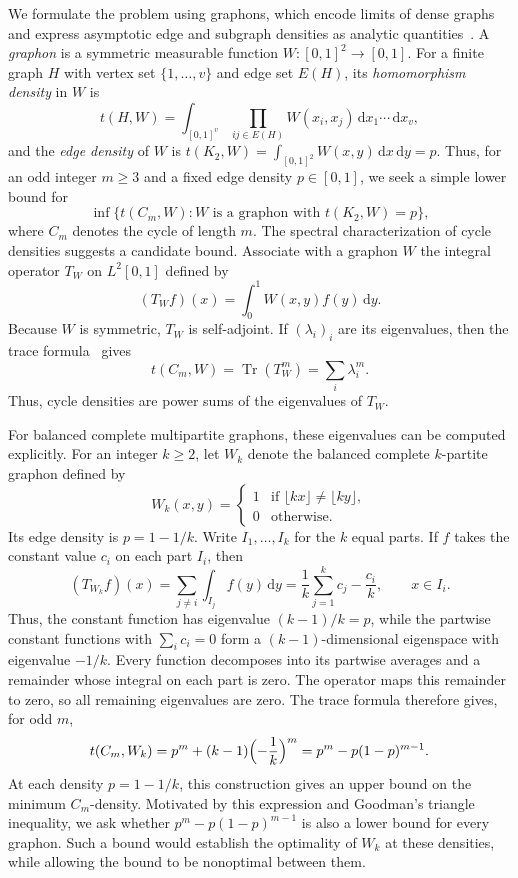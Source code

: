 \documentclass[11pt]{article}
\numberwithin{equation}{section}
\newcommand{\Tr}{\operatorname{Tr}}
\newcommand{\dd}{\,\mathrm d}
\newcommand{\dens}[2]{t(#1,#2)}
\newcommand{\tC}[2]{t(C_{#1},#2)}
\newcommand{\edens}[1]{t(K_{2},#1)}
\newcommand{\goodman}[2]{#1^{#2}-#1(1-#1)^{#2-1}}
\newcommand{\goal}{\goodman{p}{m}}
\newcommand{\Tker}[1]{T_{#1}}
\newcommand{\intsq}{\int_{[0,1]^2}}
\newcommand{\intcube}[1]{\int_{[0,1]^{#1}}}
\newcommand{\ddxy}{\dd x\dd y}
\begin{document}
We formulate the problem using graphons, which encode limits of dense graphs and express asymptotic edge and subgraph densities as analytic quantities~\cite{lovasz2012large,lovasz2006limits}.
A \emph{graphon} is a symmetric measurable function $W\colon[0,1]^2\to[0,1]$.
For a finite graph $H$ with vertex set $\{1,\ldots,v\}$ and edge set $E(H)$, its \emph{homomorphism density} in $W$ is
\[
  \dens HW=\intcube{v}\prod_{ij\in E(H)}W(x_i,x_j)\dd x_1\cdots\dd x_v,
\]
and the \emph{edge density} of $W$ is $\edens W=\intsq W(x,y)\ddxy=p$.
Thus, for an odd integer $m\ge3$ and a fixed edge density $p\in[0,1]$, we seek a simple lower bound for
\[
  \inf\bigl\{\tC mW: W\text{ is a graphon with }\edens W=p\bigr\},
\]
where $C_m$ denotes the cycle of length $m$.
The spectral characterization of cycle densities suggests a candidate bound.
Associate with a graphon $W$ the integral operator $\Tker W$ on $L^2[0,1]$ defined by
\[
  (\Tker{W}f)(x)=\int_0^1 W(x,y)f(y)\dd y.
\]
Because $W$ is symmetric, $\Tker W$ is self-adjoint.
If $(\lambda_i)_i$ are its eigenvalues, then the trace formula~\cite{lovasz2012large} gives
\[
  \tC mW=\Tr(\Tker W^m)=\sum_i\lambda_i^m.
\]
Thus, cycle densities are power sums of the eigenvalues of $\Tker W$.

For balanced complete multipartite graphons, these eigenvalues can be computed explicitly.
For an integer $k\ge2$, let $W_k$ denote the balanced complete $k$-partite graphon defined by
\[
  W_k(x,y)=
  \begin{cases}
    1&\text{if }\lfloor kx\rfloor\ne\lfloor ky\rfloor,\\
    0&\text{otherwise}.
\end{cases}
\]
Its edge density is $p=1-1/k$.
Write $I_1,\ldots,I_k$ for the $k$ equal parts.
If $f$ takes the constant value $c_i$ on each part $I_i$, then
\[
  (\Tker{W_k}f)(x)=\sum_{j\ne i}\int_{I_j}f(y)\dd y
  =\frac1k\sum_{j=1}^k c_j-\frac{c_i}{k},\qquad x\in I_i.
\]
Thus, the constant function has eigenvalue $(k-1)/k=p$, while the partwise constant functions with $\sum_i c_i=0$ form a $(k-1)$-dimensional eigenspace with eigenvalue $-1/k$.
Every function decomposes into its partwise averages and a remainder whose integral on each part is zero.
The operator maps this remainder to zero, so all remaining eigenvalues are zero.
The trace formula therefore gives, for odd $m$,
\begin{equation}\label{eq:intro-kpartite-value}
  \tC m{W_k}=p^m+(k-1)\Bigl(-\frac1k\Bigr)^m=\goal.
\end{equation}
At each density $p=1-1/k$, this construction gives an upper bound on the minimum $C_m$-density.
Motivated by this expression and Goodman's triangle inequality, we ask whether $\goal$ is also a lower bound for every graphon.
Such a bound would establish the optimality of $W_k$ at these densities, while allowing the bound to be nonoptimal between them.
\end{document}
